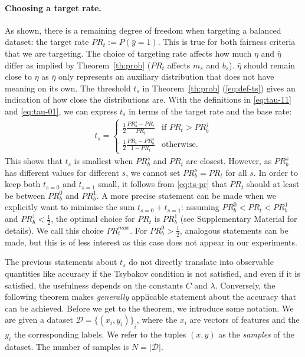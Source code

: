 \paragraph{Choosing a target rate.}
As shown, there is a remaining degree of freedom when targeting a balanced dataset:
the target rate $\mathit{PR}_t := P(\bar{y}=1)$.
This is true for both fairness criteria that we are targeting.
The choice of targeting rate affects how much $\eta$ and $\bar{\eta}$ differ as implied by Theorem~\ref{th:prob}
($\mathit{PR}_t$ affects $m_s$ and $b_s$).
$\bar{\eta}$ should remain close to $\eta$
as $\bar{\eta}$ only represents an auxiliary distribution that does not have meaning on its own.
The threshold $t_s$ in Theorem~\ref{th:prob} (\eqref{eq:def-ts}) gives an indication of how close the distributions are.
With the definitions in \eqref{eq:tau-11} and \eqref{eq:tau-01},
we can express $t_s$ in terms of the target rate and the base rate:
\begin{align}
  t_s = \begin{cases}
    \frac{1}{2}\frac{\mathit{PR}_b^s - \mathit{PR}_t}{\mathit{PR}_t} &\text{if }\mathit{PR}_t>\mathit{PR}_b^j\\
    \frac{1}{2}\frac{\mathit{PR}_t - \mathit{PR}_b^s}{1 - \mathit{PR}_t} &\text{otherwise.}
  \end{cases}\label{eq:ts-pr}
\end{align}
This shows that $t_s$ is smallest when $\mathit{PR}_b^s$ and $\mathit{PR}_t$ are closest.
However, as $\mathit{PR}_b^s$ has different values for different $s$,
we cannot set $\mathit{PR}_b^s=\mathit{PR}_t$ for all $s$.
In order to keep both $t_{s=0}$ and $t_{s=1}$ small,
it follows from \eqref{eq:ts-pr} that $\mathit{PR}_t$ should at least be between $\mathit{PR}_b^0$ and $\mathit{PR}_b^1$.
A more precise statement can be made when we explicitly want to minimise the sum $t_{s=0} + t_{s=1}$:
assuming $\mathit{PR}_b^0<\mathit{PR}_t<\mathit{PR}_b^1$ and $\mathit{PR}_b^1<\tfrac{1}{2}$,
the optimal choice for $\mathit{PR}_t$ is $\mathit{PR}_b^1$ (see Supplementary Material for details).
We call this choice $\mathit{PR}_t^{max}$.
For $\mathit{PR}_b^0>\tfrac{1}{2}$, analogous statements can be made,
but this is of less interest as this case does not appear in our experiments.

The previous statements about $t_s$ do not directly translate into observable quantities like accuracy if the Tsybakov condition is not satisfied,
and even if it is satisfied, the usefulness depends on the constants $C$ and $\lambda$.
Conversely, the following theorem makes \emph{generally} applicable statement about the accuracy that can be achieved.
Before we get to the theorem, we introduce some notation.
We are given a dataset $\mathcal{D} = {\{(x_i, y_i)\}}_i$,
where the $x_i$ are vectors of features and the $y_i$ the corresponding labels.
We refer to the tuples $(x, y)$ as the \emph{samples} of the dataset.
The number of samples is $N = |\mathcal{D}|$.

